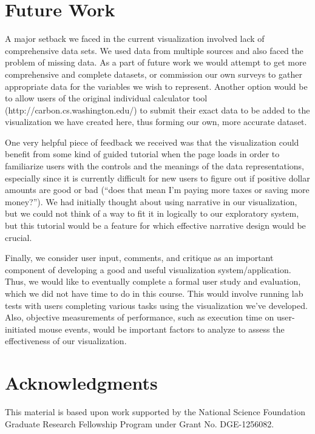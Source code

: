 \documentclass{sigchi}
\begin{document}
\section{Future Work}
A major setback we faced in the current visualization involved lack of comprehensive data sets. We used data from multiple sources and also faced the problem of missing data. As a part of future work we would attempt to get more comprehensive and complete datasets, or commission our own surveys to gather appropriate data for the variables we wish to represent. Another option would be to allow users of the original individual calculator tool (http://carbon.cs.washington.edu/) to submit their exact data to be added to the visualization we have created here, thus forming our own, more accurate dataset. 

One very helpful piece of feedback we received was that the visualization could benefit from some kind of guided tutorial when the page loads in order to familiarize users with the controls and the meanings of the data representations, especially since it is currently difficult for new users to figure out if positive dollar amounts are good or bad (``does that mean I'm paying more taxes or saving more money?''). We had initially thought about using narrative in our visualization, but we could not think of a way to fit it in logically to our exploratory system, but this tutorial would be a feature for which effective narrative design would be crucial. 

Finally, we consider user input, comments, and critique as an important component of developing a good and useful visualization system/application. Thus, we would like to eventually complete a formal user study and evaluation, which we did not have time to do in this course. This would involve running lab tests with users completing various tasks using the visualization we've developed. Also, objective measurements of performance, such as execution time on user-initiated mouse events, would be important factors to analyze to assess the effectiveness of our visualization. 


\section{Acknowledgments}

This material is based upon work supported by the National Science Foundation
Graduate Research Fellowship Program under Grant No. DGE-1256082.
\end{document}
